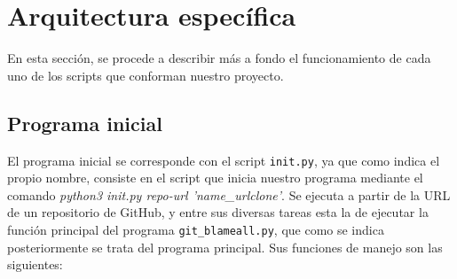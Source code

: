 \documentclass[a4paper, 12pt]{book}
\begin{document}
\section{Arquitectura específica} 
\label{sec:arquitectura-especifica}

En esta sección, se procede a describir más a fondo el funcionamiento de cada uno de los scripts que conforman nuestro proyecto.

\subsection{Programa inicial}
\label{subsec:programa-inicial}

El programa inicial se corresponde con el script \texttt{init.py}, ya que como indica el propio nombre, consiste en el script que inicia nuestro programa mediante el comando \textit{python3 init.py repo-url 'name\_urlclone'}.
Se ejecuta a partir de la URL de un repositorio de GitHub, y entre sus diversas tareas esta la de ejecutar la función principal del programa \texttt{git\_blameall.py}, que como se indica posteriormente se trata del
programa principal. Sus funciones de manejo son las siguientes:
\end{document}
